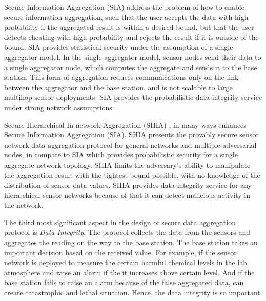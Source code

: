 	Secure Information Aggregation (SIA) \cite{przydatek2003sia}  address the problem of how to enable secure information aggregation, such that the user accepts the data with high probability if the aggregated result is within a desired bound, but that the user detects cheating with high probability and rejects the result if it is outside of the bound.
	SIA provides statistical security under the assumption of a single-aggregator model.
	In the single-aggregator model, sensor nodes send their data to a single
	aggregator node, which computes the aggregate and sends it to the
	base station.
	This form of aggregation reduces communications only on the link between the aggregator and the base station, and is not scalable to large multihop sensor deployments.
	SIA provides the probabilistic data-integrity service under strong network assumptions.

	Secure Hierarchical In-network Aggregation (SHIA) \cite{chan2006secure}, in many ways enhances Secure Information Aggregation (SIA).
	SHIA presents the provably secure sensor network data aggregation protocol for general networks and multiple adversarial nodes, in compare to SIA which provides probabilistic security for a single aggregate network topology.
	SHIA limits the adversary’s ability to manipulate the aggregation result with the tightest bound possible, with no knowledge of the distribution of sensor data values.
	SHIA provides data-integrity service for any hierarchical sensor networks because of that it can detect malicious activity in the network.

	The third most significant aspect in the design of secure data aggregation protocol is \textit{Data Integrity}.
	The protocol collects the data from the sensors and aggregates the reading on the way to the base station.
	The base station takes an important decision based on the received value.
	For example, if the sensor network is deployed to measure the certain harmful chemical levels in the lab atmosphere and raise an alarm if the it increases above certain level.
	And if the base station fails to raise an alarm because of the false aggregated data, can create catastrophic and lethal situation.
	Hence, the data integrity is so important.


